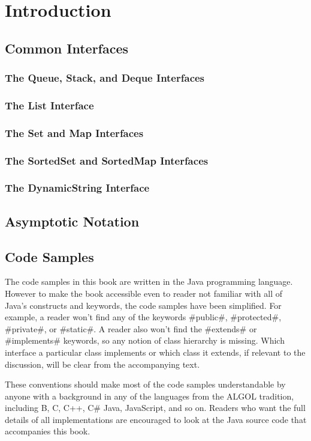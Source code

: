 \chapter{Introduction}

\section{Common Interfaces}
\subsection{The Queue, Stack, and Deque Interfaces}
\subsection{The List Interface}
\subsection{The Set and Map Interfaces}
\subsection{The SortedSet and SortedMap Interfaces}
\subsection{The DynamicString Interface}
\section{Asymptotic Notation}
\section{Code Samples}

The code samples in this book are written in the Java programming
language.  However to make the book accessible even to reader not
familiar with all of Java's constructs and keywords, the code samples have
been simplified.  For example, a reader won't find any of the keywords
#public#, #protected#, #private#, or #static#.  A reader also won't
find the #extends# or #implements# keywords, so any notion of class
hierarchy is missing.  Which interface a particular class implements
or which class it extends, if relevant to the discussion, will be clear
from the accompanying text.

These conventions should make most of the code samples understandable by
anyone with a background in any of the languages from the ALGOL tradition,
including B, C, C++, C\# Java, JavaScript, and so on.  Readers who want
the full details of all implementations are encouraged to look at the
Java source code that accompanies this book.


